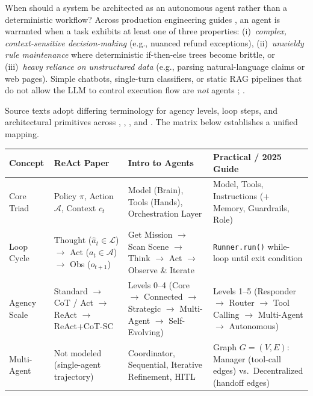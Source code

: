 \documentclass[../../../../master.tex]{subfiles}
\begin{document}
When should a system be architected as an autonomous agent rather than a deterministic workflow? Across production engineering guides , an agent is warranted when a task exhibits at least one of three properties: (i)~\emph{complex, context-sensitive decision-making} (e.g., nuanced refund exceptions), (ii)~\emph{unwieldy rule maintenance} where deterministic if-then-else trees become brittle, or (iii)~\emph{heavy reliance on unstructured data} (e.g., parsing natural-language claims or web pages). Simple chatbots, single-turn classifiers, or static RAG pipelines that do not allow the LLM to control execution flow are \emph{not} agents ; .

\begin{crossbook}
\label{tab:agent:reconciliation}
Source texts adopt differing terminology for agency levels, loop steps, and architectural primitives across , , , and . The matrix below establishes a unified mapping.
\par\medskip
\renewcommand{\arraystretch}{1.25}
\begin{tabularx}{\linewidth}{@{} >{\raggedright\arraybackslash}p{1.85cm} >{\raggedright\arraybackslash}X >{\raggedright\arraybackslash}X >{\raggedright\arraybackslash}X @{}}
  \toprule
  \textbf{Concept} & \textbf{ReAct Paper} & \textbf{Intro to Agents} & \textbf{Practical / 2025 Guide} \\
  \midrule
  Core Triad & Policy $\pi$, Action $\mathcal{A}$, Context $c_t$ & Model (Brain), Tools (Hands), Orchestration Layer & Model, Tools, Instructions (+ Memory, Guardrails, Role) \\
  Loop Cycle & Thought ($\hat{a}_t \in \mathcal{L}$) $\to$ Act ($a_t \in \mathcal{A}$) $\to$ Obs ($o_{t+1}$) & Get Mission $\to$ Scan Scene $\to$ Think $\to$ Act $\to$ Observe \& Iterate & \texttt{Runner.run()} while-loop until exit condition \\
  Agency Scale & Standard $\to$ CoT / Act $\to$ ReAct $\to$ ReAct+CoT-SC & Levels 0--4 (Core $\to$ Connected $\to$ Strategic $\to$ Multi-Agent $\to$ Self-Evolving) & Levels 1--5 (Responder $\to$ Router $\to$ Tool Calling $\to$ Multi-Agent $\to$ Autonomous) \\
  Multi-Agent & Not modeled (single-agent trajectory) & Coordinator, Sequential, Iterative Refinement, HITL & Graph $G=(V,E)$: Manager (tool-call edges) vs.\ Decentralized (handoff edges) \\
  \bottomrule
\end{tabularx}
\end{crossbook}
\end{document}
